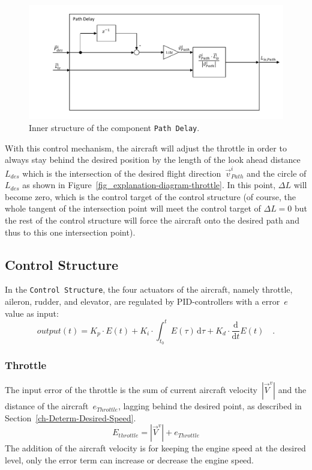 \documentclass[11pt,a4paper]{scrartcl}		%
\begin{document}
\begin{figure}[tbh]
  \begin{center}
  	\includegraphics[width=12cm]{pictures/Path_Delay.pdf}
  \end{center}
  \caption{Inner structure of the component \texttt{Path Delay}.}
  \label{fig_Path_Delay}
\end{figure} 

With this control mechanism, the aircraft will adjust the throttle in order to always stay behind the desired position by the length of the look ahead distance~$L_{des}$ which is the intersection of the desired flight direction~$\vec{v}_{Path}^i$ and the circle of $L_{des}$ as shown in Figure~\ref{fig_explanation-diagram-throttle}. In this point, $\Delta L$ will become zero, which is the control target of the control structure (of course, the whole tangent of the intersection point will meet the control target of $\Delta L = 0$ but the rest of the control structure will force the aircraft onto the desired path and thus to this one intersection point).  

\medskip





\subsection{Control Structure}

In the \texttt{Control Structure}, the four actuators of the aircraft, namely throttle, aileron, rudder, and elevator, are regulated by PID-controllers with a error~$e$ value as input:
\begin{equation}
output(t) = K_p \cdot E(t) + K_i \cdot \int_{t_0}^t E(\tau)\, \mathrm{d}\tau + K_d \cdot \frac{\mathrm{d}}{\mathrm{d}t}E(t)\quad .
\end{equation}

\subsubsection*{Throttle}
The input error of the throttle is the sum of current aircraft velocity~$|\vec{V}^v|$ and the distance of the aircraft~$e_{Throttle}$, lagging behind the desired point, as described in Section~\ref{ch-Determ-Desired-Speed}. 
\begin{equation}
E_{throttle} = |\vec{V}^v| + e_{Throttle}
\end{equation} 
The addition of the aircraft velocity is for keeping the engine speed at the desired level, only the error term can increase or decrease the engine speed.
\end{document}
